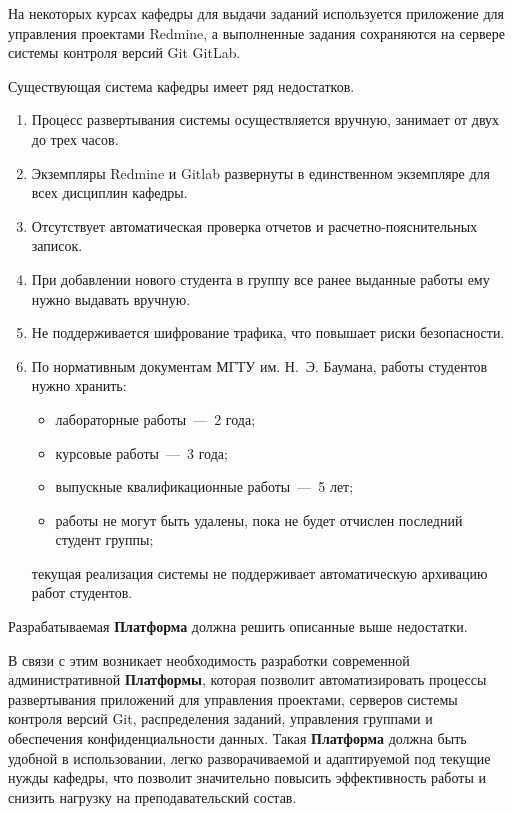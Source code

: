 На некоторых курсах кафедры для выдачи заданий используется приложение для управления проектами Redmine, а выполненные задания сохраняются на сервере системы контроля версий Git GitLab. 


Существующая система кафедры имеет ряд недостатков.

\begin{enumerate}
	\item Процесс развертывания системы осуществляется вручную, занимает от двух до трех часов.
	\item Экземпляры Redmine и Gitlab развернуты в единственном экземпляре для всех дисциплин кафедры. 
	\item Отсутствует автоматическая проверка отчетов и расчетно-пояснительных записок.
	\item При добавлении нового студента в группу все ранее выданные работы ему нужно выдавать вручную.
	\item Не поддерживается шифрование трафика, что повышает риски безопасности.
	\item По нормативным документам МГТУ им. Н.~Э. Баумана, работы студентов нужно хранить:
	\begin{itemize}
		\item лабораторные работы~---~2 года;
		\item курсовые работы~---~3 года;
		\item выпускные квалификационные работы~---~5 лет;
		\item работы не могут быть удалены, пока не будет отчислен последний студент группы;
	\end{itemize}
	текущая реализация системы не поддерживает автоматическую архивацию работ студентов.
\end{enumerate}

 Разрабатываемая \textbf{Платформа}  должна решить описанные выше недостатки.



В связи с этим возникает необходимость разработки современной административной \textbf{Платформы}, которая позволит автоматизировать процессы развертывания приложений для управления проектами, серверов системы контроля версий Git, распределения заданий, управления группами и обеспечения конфиденциальности данных. Такая \textbf{Платформа} должна быть удобной в использовании, легко разворачиваемой и адаптируемой под текущие нужды кафедры, что позволит значительно повысить эффективность работы и снизить нагрузку на преподавательский состав.


